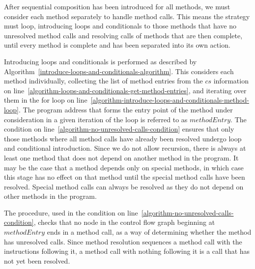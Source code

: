 After sequential composition has been introduced for all methods, we
must consider each method separately to handle method calls.
This means the strategy must loop, introducing loops and conditionals
to those methods that have no unresolved method calls and resolving
calls of methods that are then complete, until every method is
complete and has been separated into its own action.

Introducing loops and conditionals is performed as described by
Algorithm~\ref{introduce-loops-and-conditionals-algorithm}.
This considers each method individually, collecting the list of method
entries from the $cs$ information on
line~\ref{algorithm-loops-and-conditionals-get-method-entries}, and
iterating over them in the for loop on
line~\ref{algorithm-introduce-loops-and-conditionals-method-loop}.
The program address that forms the entry point of the method under
consideration in a given iteration of the loop is referred to as
$methodEntry$.
The condition on line~\ref{algorithm-no-unresolved-calls-condition}
ensures that only those methods where all method calls have already
been resolved undergo loop and conditional introduction.
Since we do not allow recursion, there is always at least one method
that does not depend on another method in the program.
It may be the case that a method depends only on special methods, in
which case this stage has no effect on that method until the special
method calls have been resolved.
Special method calls can always be resolved as they do not depend on
other methods in the program.

The  procedure, used in the
condition on line~\ref{algorithm-no-unresolved-calls-condition},
checks that no node in the control flow graph beginning at
$methodEntry$ ends in a method call, as a way of determining whether
the method has unresolved calls.
Since method resolution sequences a method call with the instructions
following it, a method call with nothing following it is a call that
has not yet been resolved.

